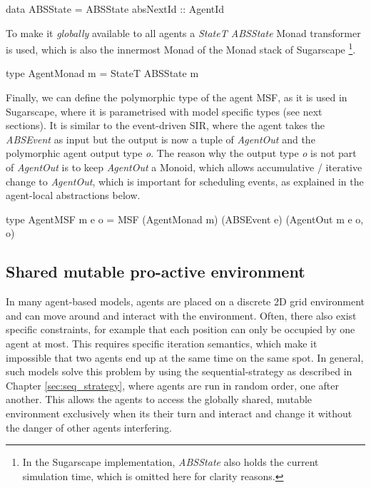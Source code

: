 \begin{HaskellCode}
data ABSState = ABSState { absNextId :: AgentId }
\end{HaskellCode}

To make it \textit{globally} available to all agents a \textit{StateT ABSState} Monad transformer is used, which is also the innermost Monad of the Monad stack of Sugarscape \footnote{In the Sugarscape implementation, \textit{ABSState} also holds the current simulation time, which is omitted here for clarity reasons.}.

\begin{HaskellCode}
type AgentMonad m = StateT ABSState m
\end{HaskellCode}

Finally, we can define the polymorphic type of the agent MSF, as it is used in Sugarscape, where it is parametrised with model specific types (see next sections). It is similar to the event-driven SIR, where the agent takes the \textit{ABSEvent} as input but the output is now a tuple of \textit{AgentOut} and the polymorphic agent output type \textit{o}. The reason why the output type \textit{o} is not part of \textit{AgentOut} is to keep \textit{AgentOut} a Monoid, which allows accumulative / iterative change to \textit{AgentOut}, which is important for scheduling events, as explained in the agent-local abstractions below.

\begin{HaskellCode}
type AgentMSF m e o = MSF (AgentMonad m) (ABSEvent e) (AgentOut m e o, o)
\end{HaskellCode}

\subsection{Shared mutable pro-active environment}
In many agent-based models, agents are placed on a discrete 2D grid environment and can move around and interact with the environment. Often, there also exist specific constraints, for example that each position can only be occupied by one agent at most. This requires specific iteration semantics, which make it impossible that two agents end up at the same time on the same spot. In general, such models solve this problem by using the sequential-strategy as described in Chapter \ref{sec:seq_strategy}, where agents are run in random order, one after another. This allows the agents to access the globally shared, mutable environment exclusively when its their turn and interact and change it without the danger of other agents interfering.

